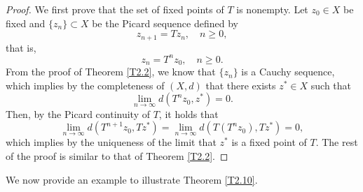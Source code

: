\documentclass[letterpaper,12pt]{article}
\numberwithin{equation}{section}
\theoremstyle{definition}
\theoremstyle{remark}
\begin{document}
\begin{proof}
We first prove that the set of fixed points of $T$ is nonempty. Let $z_0\in X$ be fixed and  $\{z_n\}\subset X$ be the Picard sequence defined by  
$$
z_{n+1}=Tz_n,\quad  n\geq 0,
$$	
that is,
$$
z_n=T^nz_0,\quad n\geq 0. 
$$
From the proof of Theorem \ref{T2.2}, we know that $\{z_n\}$ is a Cauchy sequence, which implies by the completeness of $(X,d)$ that there exists $z^*\in X$ such that 
$$
\lim_{n\to \infty}d(T^nz_0,z^*)=0. 
$$
Then, by the Picard continuity of $T$, it holds that 
$$
\lim_{n\to \infty}d(T^{n+1}z_0,Tz^*)=\lim_{n\to \infty}d(T(T^nz_0),Tz^*)=0, 
$$
which implies by the uniqueness of the limit that $z^*$ is a fixed point of $T$. The rest of the proof is similar to that of Theorem \ref{T2.2}.
\end{proof}

We now provide an example to illustrate Theorem \ref{T2.10}. 
\end{document}
